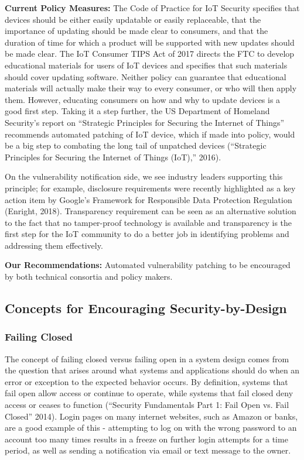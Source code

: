 {\bf Current Policy Measures:} The Code of Practice for IoT Security specifies that devices should be either easily updatable or easily replaceable, that the importance of updating should be made clear to consumers, and that the duration of time for which a product will be supported with new updates should be made clear. The IoT Consumer TIPS Act of 2017 directs the FTC to develop educational materials for users of IoT devices and specifies that such materials should cover updating software. Neither policy can guarantee that educational materials will actually make their way to every consumer, or who will then apply them. However, educating consumers on how and why to update devices is a good first step. Taking it a step further, the US Department of Homeland Security’s report on “Strategic Principles for Securing the Internet of Things” recommends automated patching of IoT device, which if made into policy, would be a big step to combating the long tail of unpatched devices (“Strategic Principles for Securing the Internet of Things (IoT),” 2016).

On the vulnerability notification side, we see industry leaders supporting this principle; for example, disclosure requirements were recently highlighted as a key action item by Google’s Framework for Responsible Data Protection Regulation (Enright, 2018). Transparency requirement can be seen as an alternative solution to the fact that no tamper-proof technology is available and transparency is the first step for the IoT community to do a better job in identifying problems and addressing them effectively.

{\bf Our Recommendations:}
Automated vulnerability patching to be encouraged by both technical consortia and policy makers.

\subsection{Concepts for Encouraging Security-by-Design}

\subsubsection{Failing Closed}

The concept of failing closed versus failing open in a system design comes from the question that arises around what systems and applications should do when an error or exception to the expected behavior occurs. By definition, systems that fail open allow access or continue to operate, while systems that fail closed deny access or ceases to function (“Security Fundamentals Part 1: Fail Open vs. Fail Closed” 2014). Login pages on many internet websites, such as Amazon or banks, are a good example of this - attempting to log on with the wrong password to an account too many times results in a freeze on further login attempts for a time period, as well as sending a notification via email or text message to the owner.

